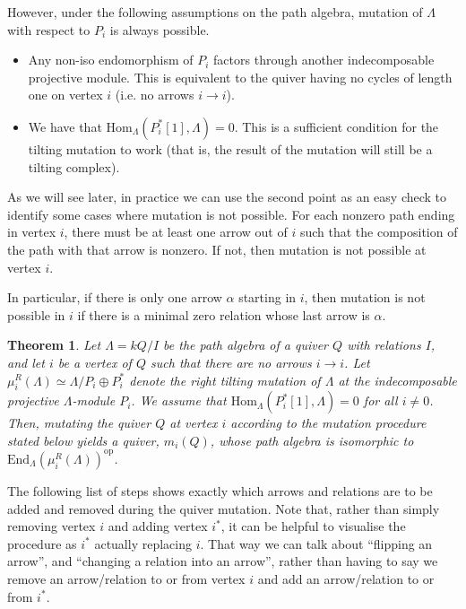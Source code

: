\documentclass[12pt, dvipsnames, oneside]{amsart}
\newtheorem{theorem}{Theorem}[section]
\theoremstyle{definition}
\newcommand{\Hom}{\text{Hom}}
\newcommand{\End}{\text{End}}
\begin{document}
However, under the following assumptions on the path algebra, mutation of $\Lambda$ with respect to $P_i$ is always possible. 

\begin{itemize}
\item Any non-iso endomorphism of $P_i$ factors through another indecomposable projective module. This is equivalent to the quiver having no cycles of length one on vertex $i$ (i.e. no arrows $i\rightarrow i$).
\item We have that $\Hom_{\Lambda}(P_i^*[1], \Lambda) = 0$. This is a sufficient condition for the tilting mutation to work (that is, the result of the mutation will still be a tilting complex).
\end{itemize}

As we will see later, in practice we can use the second point as an easy check to identify some cases where mutation is not possible. For each nonzero path ending in vertex $i$, there must be at least one arrow out of $i$ such that the composition of the path with that arrow is nonzero. If not, then mutation is not possible at vertex $i$. 

In particular, if there is only one arrow $\alpha$ starting in $i$, then mutation is not possible in $i$ if there is a minimal zero relation whose last arrow is $\alpha$. 

\begin{theorem}\label{theorem:mainResult}
Let $\Lambda=kQ/I$ be the path algebra of a quiver $Q$ with relations $I$, and let $i$ be a vertex of $Q$ such that there are no arrows $i\rightarrow i$. Let $\mu_i^R(\Lambda)\simeq\Lambda/P_i\oplus P_i^*$ denote the right tilting mutation of $\Lambda$ at the indecomposable projective $\Lambda$-module $P_i$. We assume that $\Hom_\Lambda(P_i^*[1], \Lambda)=0$ for all $i\neq 0$.
Then, mutating the quiver $Q$ at vertex $i$ according to the mutation procedure stated below yields a quiver, $m_i(Q)$, whose path algebra is isomorphic to $\End_\Lambda(\mu_i^R(\Lambda))^{\text{op}}$.
\end{theorem}

The following list of steps shows exactly which arrows and relations are to be added and removed during the quiver mutation. Note that, rather than simply removing vertex $i$ and adding vertex $i^*$, it can be helpful to visualise the procedure as $i^*$ actually replacing $i$. That way we can talk about ``flipping an arrow'', and ``changing a relation into an arrow'', rather than having to say we remove an arrow/relation to or from vertex $i$ and add an arrow/relation to or from $i^*$.
\end{document}
